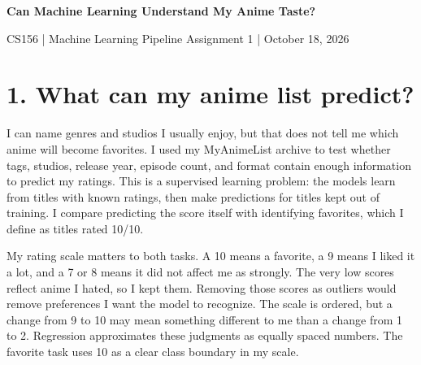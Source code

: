 \documentclass[10pt,a4paper]{article}
\begin{document}
{\huge\bfseries\color{accent} Can Machine Learning Understand My Anime Taste?\par}\vspace{.5em}
{\small CS156 | Machine Learning Pipeline Assignment 1 | October 18, 2026\par}\vspace{1em}

\section*{1. What can my anime list predict?}
I can name genres and studios I usually enjoy, but that does not tell me which anime will become favorites. I used my MyAnimeList archive to test whether tags, studios, release year, episode count, and format contain enough information to predict my ratings. This is a supervised learning problem: the models learn from titles with known ratings, then make predictions for titles kept out of training. I compare predicting the score itself with identifying favorites, which I define as titles rated 10/10.

My rating scale matters to both tasks. A 10 means a favorite, a 9 means I liked it a lot, and a 7 or 8 means it did not affect me as strongly. The very low scores reflect anime I hated, so I kept them. Removing those scores as outliers would remove preferences I want the model to recognize. The scale is ordered, but a change from 9 to 10 may mean something different to me than a change from 1 to 2. Regression approximates these judgments as equally spaced numbers. The favorite task uses 10 as a clear class boundary in my scale.
\end{document}
